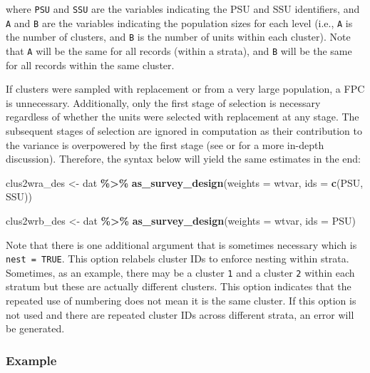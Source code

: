 \documentclass[
]{krantz}
\makeatletter
\newenvironment{Shaded}{\begin{snugshade}}{\end{snugshade}}
\newcommand{\AttributeTok}[1]{\textcolor[rgb]{0.27,0.27,0.27}{#1}}
\newcommand{\FunctionTok}[1]{\textcolor[rgb]{0.27,0.27,0.27}{\textbf{#1}}}
\newcommand{\NormalTok}[1]{#1}
\newcommand{\OtherTok}[1]{\textcolor[rgb]{0.37,0.37,0.37}{#1}}
\newcommand{\SpecialCharTok}[1]{\textcolor[rgb]{0.43,0.43,0.43}{\textbf{#1}}}
\newenvironment{kframe}{%
\medskip{}
\setlength{\fboxsep}{.8em}
 \def\at@end@of@kframe{}%
 \ifinner\ifhmode%
  \def\at@end@of@kframe{\end{minipage}}%
  \begin{minipage}{\columnwidth}%
 \fi\fi%
 \def\FrameCommand##1{\hskip\@totalleftmargin \hskip-\fboxsep
 \colorbox{shadecolor}{##1}\hskip-\fboxsep
     \hskip-\linewidth \hskip-\@totalleftmargin \hskip\columnwidth}%
 \MakeFramed {\advance\hsize-\width
   \@totalleftmargin\z@ \linewidth\hsize
   \@setminipage}}%
 {\par\unskip\endMakeFramed%
 \at@end@of@kframe}
\renewenvironment{Shaded}{\begin{kframe}}{\end{kframe}}
\makeatother
\begin{document}
where \texttt{PSU} and \texttt{SSU} are the variables indicating the PSU and SSU identifiers, and \texttt{A} and \texttt{B} are the variables indicating the population sizes for each level (i.e., \texttt{A} is the number of clusters, and \texttt{B} is the number of units within each cluster). Note that \texttt{A} will be the same for all records (within a strata), and \texttt{B} will be the same for all records within the same cluster.

If clusters were sampled with replacement or from a very large population, a FPC is unnecessary. Additionally, only the first stage of selection is necessary regardless of whether the units were selected with replacement at any stage. The subsequent stages of selection are ignored in computation as their contribution to the variance is overpowered by the first stage (see \citet{sarndal2003model} or \citet{wolter2007introduction} for a more in-depth discussion). Therefore, the syntax below will yield the same estimates in the end:

\begin{Shaded}
\begin{Highlighting}[]
\NormalTok{clus2wra\_des }\OtherTok{\textless{}{-}}\NormalTok{ dat }\SpecialCharTok{\%\textgreater{}\%}
 \FunctionTok{as\_survey\_design}\NormalTok{(}\AttributeTok{weights =}\NormalTok{ wtvar, }
                  \AttributeTok{ids =} \FunctionTok{c}\NormalTok{(PSU, SSU))}

\NormalTok{clus2wrb\_des }\OtherTok{\textless{}{-}}\NormalTok{ dat }\SpecialCharTok{\%\textgreater{}\%}
 \FunctionTok{as\_survey\_design}\NormalTok{(}\AttributeTok{weights =}\NormalTok{ wtvar, }
                  \AttributeTok{ids =}\NormalTok{ PSU)}
\end{Highlighting}
\end{Shaded}

Note that there is one additional argument that is sometimes necessary which is \texttt{nest\ =\ TRUE}. This option relabels cluster IDs to enforce nesting within strata. Sometimes, as an example, there may be a cluster \texttt{1} and a cluster \texttt{2} within each stratum but these are actually different clusters. This option indicates that the repeated use of numbering does not mean it is the same cluster. If this option is not used and there are repeated cluster IDs across different strata, an error will be generated.

\hypertarget{example-5}{%
\subsubsection*{Example}\label{example-5}}
\end{document}
